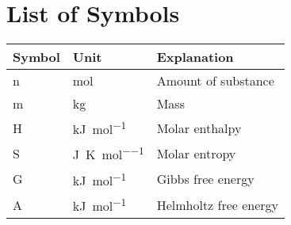 \section*{List of Symbols}
\begin{table}[H]
\centering
\begin{tabular}{lll}
 \toprule
  \textbf{Symbol}   &\textbf{Unit}      &\textbf{Explanation}\\
  \midrule
    n               & \si{\mole}        & Amount of substance \\
    m               & \si{\kilo\gram}   & Mass \\
    H               & \si{\kilo\joule\per\mole} & Molar enthalpy \\
    S               & \si{\joule\per\kelvin\per\mole}   & Molar entropy \\
    G               & \si{\kilo\joule\per\mole} & Gibbs free energy \\
    A               & \si{\kilo\joule\per\mole} & Helmholtz free energy \\
  \bottomrule
  \end{tabular}
\end{table}
